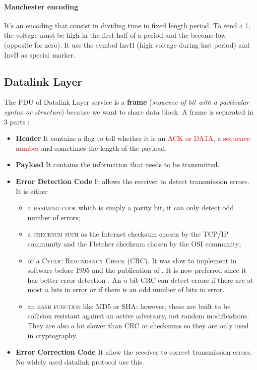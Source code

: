 \paragraph{Manchester encoding}
It's an encoding that consist in dividing time in fixed length period. To send a 1, the voltage must be high in the first half of a period and the become low (opposite for zero). It use the symbol InvH (high voltage during last period) and InvB as special marker.

\subsection{Datalink Layer}
The PDU of Datalink Layer service is a \textbf{frame} (\textit{sequence of bit with a particular syntax or structure}) because we want to share data block.
A frame is separated in 3 parts :
\begin{itemize}
    \item \textbf{Header} It contains a flag to tell whether it is an \textcolor{red}{ACK or DATA}, a \textcolor{red}{sequence number} and sometimes the length of the payload.
  \item \textbf{Payload} It contains the information that needs to be transmitted.
  \item \textbf{Error Detection Code} It allows the receiver to detect transmission errors.
    It is either
    \begin{itemize}
        \item a \textsc{hamming code} which is simply a parity bit, it can only detect odd number of errors;
        \item a \textsc{checksum such} as the Internet checksum chosen by the TCP/IP community and the
        Fletcher checksum chosen by the OSI community;
    \item or a \textsc{Cyclic Redundancy Check} (CRC).
        It was slow to implement in software before 1995 and the publication of \cite{feldmeier1995fast}.
        It is now preferred since it has better error detection \cite{stone1998performance}.
        An $n$ bit CRC can detect errors if there are at most $n$
        bits in error or if there is an odd number of bits in error.
    \item an \textsc{hash function} like MD5 or SHA: however, these are built to be collision resistant against
        an active adversary, not random modifications.
        They are also a lot slower than CRC or checksums so they are only used in cryptography.
    \end{itemize}
  \item \textbf{Error Correction Code} It allow the receiver to correct transmission errors.
    No widely used datalink protocol use this.
\end{itemize}

